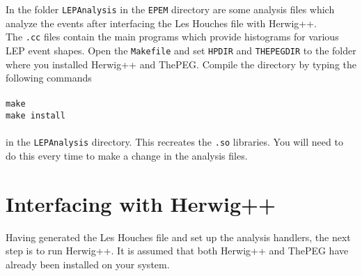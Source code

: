 \documentclass[12pt,a4paper,oneside]{article}
\begin{document}
In the folder {\tt LEPAnalysis} in the {\tt EPEM} directory are some analysis files
which analyze the events after interfacing the Les Houches file with
\textsf{Herwig++}. \\ The
{\tt .cc} files contain the main programs which provide
histograms for various LEP event shapes. Open the {\tt Makefile} and set {\tt HPDIR} and
{\tt THEPEGDIR} to the folder where you installed \textsf{Herwig++} and \textsf{ThePEG}. Compile the directory by typing the following commands\\
\\
{\tt make} \\
{\tt make install} \\
\\
in the {\tt LEPAnalysis} directory. This recreates the {\tt .so} libraries. You will need
to do this every time to make a change in the analysis files. 

\section{Interfacing with \textsf{Herwig++}}
Having generated the Les Houches file and set up the analysis handlers, the next step is to
run \textsf{Herwig++}. It is assumed that both \textsf{Herwig++} and \textsf{ThePEG} have
already been installed on your system. 
\end{document}
